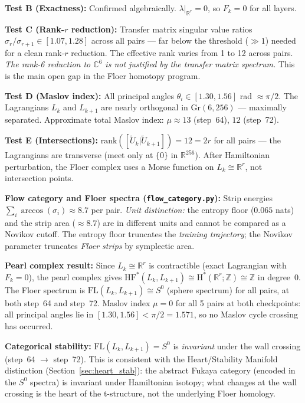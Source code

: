 \documentclass[11pt]{amsart}
\begin{document}
\textbf{Test B (Exactness):} Confirmed algebraically.
$\lambda|_{\mathbb{R}^r} = 0$, so $F_k = 0$ for all layers. \checkmark

\textbf{Test C (Rank-$r$ reduction):}
Transfer matrix singular value ratios $\sigma_r/\sigma_{r+1} \in [1.07, 1.28]$
across all pairs --- far below the threshold ($\gg 1$) needed for a clean
rank-$r$ reduction.
The effective rank varies from 1 to 12 across pairs.
\emph{The rank-6 reduction to $\mathbb{C}^6$ is not justified by the
transfer matrix spectrum.}
This is the main open gap in the Floer homotopy program.

\textbf{Test D (Maslov index):}
All principal angles $\theta_i \in [1.30, 1.56]$ rad $\approx \pi/2$.
The Lagrangians $L_k$ and $L_{k+1}$ are nearly orthogonal in $\mathrm{Gr}(6,256)$
--- maximally separated.
Approximate total Maslov index: $\mu \approx 13$ (step~64), $12$ (step~72).

\textbf{Test E (Intersections):}
$\mathrm{rank}([\tilde{U}_k | \tilde{U}_{k+1}]) = 12 = 2r$ for all pairs
--- the Lagrangians are transverse (meet only at $\{0\}$ in $\mathbb{R}^{256}$).
After Hamiltonian perturbation, the Floer complex uses a Morse function
on $L_k \cong \mathbb{R}^r$, not intersection points. \checkmark

\textbf{Flow category and Floer spectra (\texttt{flow\_category.py}):}
Strip energies $\sum_i \arccos(\sigma_i) \approx 8.7$ per pair.
\emph{Unit distinction:} the entropy floor ($0.065$ nats) and the strip area
($\approx 8.7$) are in different units and cannot be compared as a Novikov cutoff.
The entropy floor truncates the \emph{training trajectory};
the Novikov parameter truncates \emph{Floer strips} by symplectic area.

\textbf{Pearl complex result:} Since $L_k \cong \mathbb{R}^r$ is contractible
(exact Lagrangian with $F_k = 0$), the pearl complex gives
$\mathrm{HF}^*(L_k, L_{k+1}) \cong \mathrm{H}^*(\mathbb{R}^r;\mathbb{Z}) \cong \mathbb{Z}$
in degree~0.
The Floer spectrum is $\mathrm{FL}(L_k, L_{k+1}) \cong S^0$ (sphere spectrum)
for all pairs, at both step~64 and step~72.
Maslov index $\mu = 0$ for all 5 pairs at both checkpoints:
all principal angles lie in $[1.30, 1.56] < \pi/2 = 1.571$,
so no Maslov cycle crossing has occurred.

\textbf{Categorical stability:}
$\mathrm{FL}(L_k, L_{k+1}) = S^0$ is \emph{invariant} under the wall
crossing (step~64 $\to$ step~72).
This is consistent with the Heart/Stability Manifold distinction
(Section~\ref{sec:heart_stab}): the abstract Fukaya category
(encoded in the $S^0$ spectra) is invariant under Hamiltonian isotopy;
what changes at the wall crossing is the heart of the t-structure,
not the underlying Floer homology.
\end{document}
